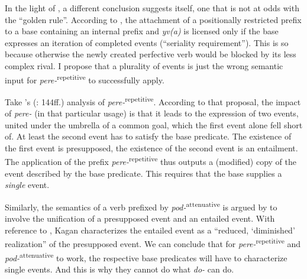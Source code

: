 \documentclass[output=paper,
colorlinks,
citecolor=brown,
newtxmath
]{langscibook}
\begin{document}
In the light of , a different conclusion suggests itself, one that is not at odds with the ``golden rule''. According to , the attachment of a positionally restricted prefix to a base containing an internal prefix and \textit{yv(a)} is licensed only if the base expresses an iteration of completed events (``seriality requirement''). This is so because otherwise the newly created perfective verb would be blocked by its less complex rival. I propose that a plurality of events is just the wrong semantic input for \textit{pere-}\textsuperscript{repetitive} to successfully apply.

Take \citeauthor{Kagan2015}'s (\citeyear{Kagan2015}: 144ff.) analysis of \textit{pere-}\textsuperscript{repetitive}. According to that proposal, the impact of \textit{pere-} (in that particular usage) is that it leads to the expression of two events, united under the umbrella of a common goal, which the first event alone fell short of. At least the second event has to satisfy the base predicate. The existence of the first event is presupposed, the existence of the second event is an entailment. The application of the prefix \textit{pere-}\textsuperscript{repetitive} thus outputs a (modified) copy of the event described by the base predicate. This requires that the base supplies a \textit{single} event.

Similarly, the semantics of a verb prefixed by \textit{pod-}\textsuperscript{attenuative} is argued by \citet[109]{Kagan2015} to involve the unification of a presupposed event and an entailed event. With reference to \citet{Plungjan2001}, Kagan characterizes the entailed event as a ``reduced, `diminished' realization'' of the presupposed event. We can conclude that for \textit{pere-}\textsuperscript{repetitive} and \textit{pod-}\textsuperscript{attenuative} to work, the respective base predicates will have to characterize single events. And this is why they cannot do what \textit{do-} can do.
\end{document}
